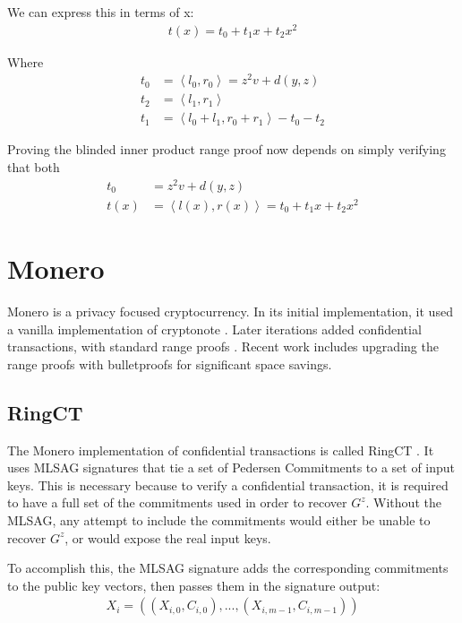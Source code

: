 \documentclass{article}
\begin{document}
We can express this in terms of x:
\begin{align}
  t(x) = t_0 + t_1 x + t_2 x^2
\end{align}

Where
\begin{align}
  t_0 &= \left<l_0, r_0\right> = z^2 v + d(y,z)\\
  t_2 &= \left<l_1, r_1\right>\\
  t_1 &= \left<l_0 + l_1, r_0 + r_1\right> - t_0 - t_2
\end{align}

Proving the blinded inner product range proof now depends on simply verifying that both 
\begin{align}
  t_0 &= z^2 v + d(y,z)\\
  t(x) &= \left<l(x), r(x)\right> = t_0 + t_1 x + t_2 x^2
\end{align}

\section{Monero}

Monero is a privacy focused cryptocurrency.  In its initial implementation, it used a vanilla implementation of cryptonote \cite{cryptonote}.  Later iterations added confidential transactions, with standard range proofs \cite{ringct}.  Recent work includes upgrading the range proofs with bulletproofs for significant space savings.


\subsection{RingCT}

The Monero implementation of confidential transactions is called RingCT \cite{ringct}.  It uses MLSAG signatures that tie a set of Pedersen Commitments to a set of input keys.  This is necessary because to verify a confidential transaction, it is required to have a full set of the commitments used in order to recover $G^z$.  Without the MLSAG, any attempt to include the commitments would either be unable to recover $G^z$, or would expose the real input keys.

To accomplish this, the MLSAG signature adds the corresponding commitments to the public key vectors, then passes them in the signature output:
\begin{align}
  X_i = ((X_{i,0}, C_{i,0}), ..., (X_{i,m-1}, C_{i,m-1}))
\end{align}
\end{document}
